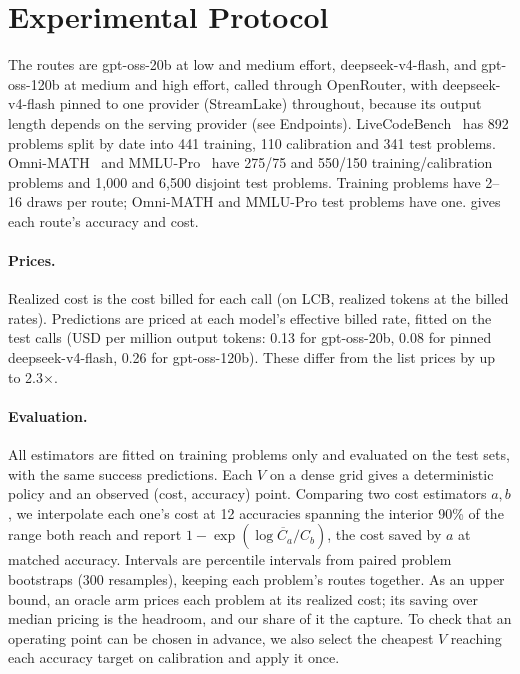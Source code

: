 \documentclass[10pt,twocolumn,letterpaper]{article}
\begin{document}
\section{Experimental Protocol}
The routes are gpt-oss-20b at low and medium effort, deepseek-v4-flash, and gpt-oss-120b at medium and high effort, called through OpenRouter, with deepseek-v4-flash pinned to one provider (StreamLake) throughout, because its output length depends on the serving provider (see Endpoints). LiveCodeBench~\cite{lcb} has 892 problems split by date into 441 training, 110 calibration and 341 test problems. Omni-MATH~\cite{omni} and MMLU-Pro~\cite{mmlupro} have 275/75 and 550/150 training/calibration problems and 1,000 and 6,500 disjoint test problems. Training problems have 2--16 draws per route; Omni-MATH and MMLU-Pro test problems have one.  gives each route's accuracy and cost.

\paragraph{Prices.}
Realized cost is the cost billed for each call (on LCB, realized tokens at the billed rates). Predictions are priced at each model's effective billed rate, fitted on the test calls (USD per million output tokens: 0.13 for gpt-oss-20b, 0.08 for pinned deepseek-v4-flash, 0.26 for gpt-oss-120b). These differ from the list prices by up to 2.3$\times$.

\paragraph{Evaluation.}
All estimators are fitted on training problems only and evaluated on the test sets, with the same success predictions. Each $V$ on a dense grid gives a deterministic policy and an observed (cost, accuracy) point. Comparing two cost estimators $a,b$, we interpolate each one's cost at 12 accuracies spanning the interior 90\% of the range both reach and report $1-\exp(\overline{\log C_a/C_b})$, the cost saved by $a$ at matched accuracy. Intervals are percentile intervals from paired problem bootstraps (300 resamples), keeping each problem's routes together. As an upper bound, an oracle arm prices each problem at its realized cost; its saving over median pricing is the headroom, and our share of it the capture. To check that an operating point can be chosen in advance, we also select the cheapest $V$ reaching each accuracy target on calibration and apply it once.
\end{document}
